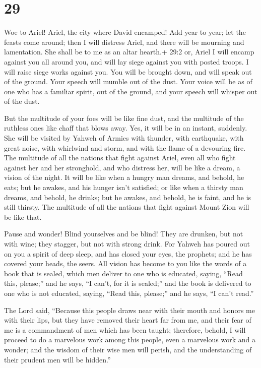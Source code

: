\hypertarget{section-28}{%
\section{29}\label{section-28}}

 Woe to Ariel! Ariel, the city where David encamped! Add
year to year; let the feasts come around;  then I will
distress Ariel, and there will be mourning and lamentation. She shall be
to me as an altar hearth.+ 29:2 or, Ariel  I will encamp
against you all around you, and will lay siege against you with posted
troops. I will raise siege works against you.  You will be
brought down, and will speak out of the ground. Your speech will mumble
out of the dust. Your voice will be as of one who has a familiar spirit,
out of the ground, and your speech will whisper out of the dust.

 But the multitude of your foes will be like fine dust, and
the multitude of the ruthless ones like chaff that blows away. Yes, it
will be in an instant, suddenly.  She will be visited by
Yahweh of Armies with thunder, with earthquake, with great noise, with
whirlwind and storm, and with the flame of a devouring fire.
 The multitude of all the nations that fight against Ariel,
even all who fight against her and her stronghold, and who distress her,
will be like a dream, a vision of the night.  It will be
like when a hungry man dreams, and behold, he eats; but he awakes, and
his hunger isn't satisfied; or like when a thirsty man dreams, and
behold, he drinks; but he awakes, and behold, he is faint, and he is
still thirsty. The multitude of all the nations that fight against Mount
Zion will be like that.

 Pause and wonder! Blind yourselves and be blind! They are
drunken, but not with wine; they stagger, but not with strong drink.
 For Yahweh has poured out on you a spirit of deep sleep,
and has closed your eyes, the prophets; and he has covered your heads,
the seers.  All vision has become to you like the words of
a book that is sealed, which men deliver to one who is educated, saying,
``Read this, please;'' and he says, ``I can't, for it is sealed;''
 and the book is delivered to one who is not educated,
saying, ``Read this, please;'' and he says, ``I can't read.''

 The Lord said, ``Because this people draws near with their
mouth and honors me with their lips, but they have removed their heart
far from me, and their fear of me is a commandment of men which has been
taught;  therefore, behold, I will proceed to do a
marvelous work among this people, even a marvelous work and a wonder;
and the wisdom of their wise men will perish, and the understanding of
their prudent men will be hidden.''

